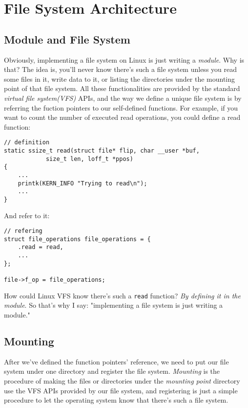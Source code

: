 \section{File System Architecture}

\subsection{Module and File System}
Obviously, implementing a file system on Linux is just writing a \emph{module}. Why is that? The idea is, you'll never know there's such a file system unless you read some files in it, write data to it, or listing the directories under the mounting point of that file system. All these functionalities are provided by the standard \emph{virtual file system(VFS)} APIs, and the way we define a unique file system is by referring the fuction pointers to our self-defined functions. For example, if you want to count the number of executed read operations, you could define a read function:\\

\begin{lstlisting}
// definition
static ssize_t read(struct file* flip, char __user *buf, 
			size_t len, loff_t *ppos)
{
	...
	printk(KERN_INFO "Trying to read\n");
	... 
}
\end{lstlisting}

And refer to it:\\
\begin{lstlisting}
// refering
struct file_operations file_operations = {
	.read = read,
	...
};

file->f_op = file_operations;
\end{lstlisting}

How could Linux VFS know there's such a \lstinline{read} function? \emph{By defining it in the module}. So that's why I say: "implementing a file system is just writing a module."

\subsection{Mounting}

After we've defined the function pointers' reference, we need to put our file system under one directory and register the file system. \emph{Mounting} is the procedure of making the files or directories under the \emph{mounting point} directory use the VFS APIs provided by our file system, and registering is just a simple procedure to let the operating system know that there's such a file system.

